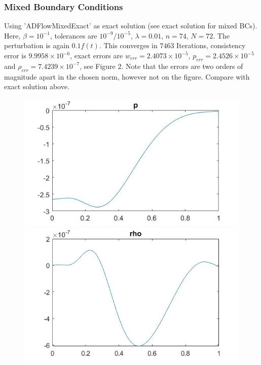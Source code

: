 \documentclass[11pt, a4paper]{article}
\theoremstyle{definition}
\begin{document}
\subsubsection*{Mixed Boundary Conditions}
Using 'ADFlowMixedExact' as exact solution (see exact solution for mixed BCs). Here, $\beta =10^{-1}$, tolerances are $10^{-9}/10^{-5}$, $\lambda =0.01$, $n=74$, $N=72$. The perturbation is again $0.1f(t)$.
This converges in $7463$ Iterations, consistency error is $9.9958 \times 10^{-6}$, exact errors are $w_{err} = 2.4073 \times 10^{-5}$, $p_{err} = 2.4526 \times 10^{-5}$ and $\rho_{err} = 7.4239 \times 10^{-7}$, see Figure 2.
Note that the errors are two orders of magnitude apart in the chosen norm, however not on the figure. Compare with exact solution above.
\begin{figure}[h]
	\includegraphics[scale=0.3]{KalMp1.jpg}
	\includegraphics[scale=0.2]{KalMrho1.jpg}

\end{figure}
\end{document}
